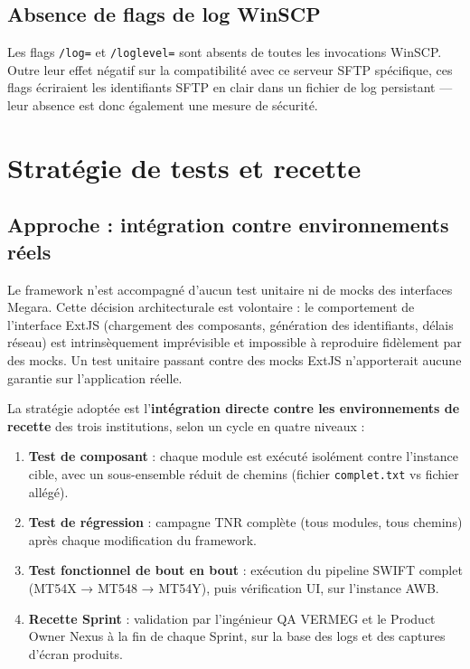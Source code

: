 \documentclass[12pt, a4paper]{report}
\begin{document}
\subsection{Absence de flags de log WinSCP}

Les flags \texttt{/log=} et \texttt{/loglevel=} sont absents de toutes les invocations WinSCP. Outre leur effet négatif sur la compatibilité avec ce serveur SFTP spécifique, ces flags écriraient les identifiants SFTP en clair dans un fichier de log persistant — leur absence est donc également une mesure de sécurité.

\section{Stratégie de tests et recette}

\subsection{Approche : intégration contre environnements réels}

Le framework n'est accompagné d'aucun test unitaire ni de mocks des interfaces Megara. Cette décision architecturale est volontaire : le comportement de l'interface ExtJS (chargement des composants, génération des identifiants, délais réseau) est intrinsèquement imprévisible et impossible à reproduire fidèlement par des mocks. Un test unitaire passant contre des mocks ExtJS n'apporterait aucune garantie sur l'application réelle.

La stratégie adoptée est l'\textbf{intégration directe contre les environnements de recette} des trois institutions, selon un cycle en quatre niveaux :

\begin{enumerate}
  \item \textbf{Test de composant} : chaque module est exécuté isolément contre l'instance cible, avec un sous-ensemble réduit de chemins (fichier \texttt{complet.txt} vs fichier allégé).
  \item \textbf{Test de régression} : campagne TNR complète (tous modules, tous chemins) après chaque modification du framework.
  \item \textbf{Test fonctionnel de bout en bout} : exécution du pipeline SWIFT complet (MT54X → MT548 → MT54Y), puis vérification UI, sur l'instance AWB.
  \item \textbf{Recette Sprint} : validation par l'ingénieur QA VERMEG et le Product Owner Nexus à la fin de chaque Sprint, sur la base des logs et des captures d'écran produits.
\end{enumerate}
\end{document}
